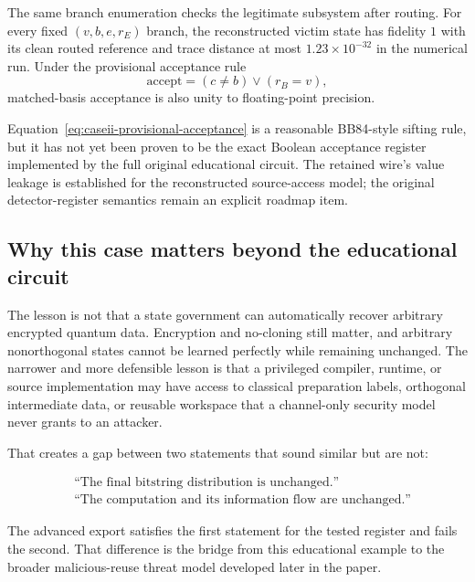 The same branch enumeration checks the legitimate subsystem after routing. For
every fixed $(v,b,e,r_E)$ branch, the reconstructed victim state has fidelity
$1$ with its clean routed reference and trace distance at most
$1.23\times10^{-32}$ in the numerical run. Under the provisional acceptance
rule
\begin{equation}
  \mathrm{accept}=(c\neq b)\lor(r_B=v),
  \label{eq:caseii-provisional-acceptance}
\end{equation}
matched-basis acceptance is also unity to floating-point precision.

\begin{rem}
Equation~\eqref{eq:caseii-provisional-acceptance} is a reasonable BB84-style
sifting rule, but it has not yet been proven to be the exact Boolean acceptance
register implemented by the full original educational circuit. The retained
wire's value leakage is established for the reconstructed source-access model;
the original detector-register semantics remain an explicit roadmap item.
\end{rem}

\subsection{Why this case matters beyond the educational circuit}

The lesson is not that a state government can automatically recover arbitrary
encrypted quantum data. Encryption and no-cloning still matter, and arbitrary
nonorthogonal states cannot be learned perfectly while remaining unchanged.
The narrower and more defensible lesson is that a privileged compiler, runtime,
or source implementation may have access to classical preparation labels,
orthogonal intermediate data, or reusable workspace that a channel-only
security model never grants to an attacker.

That creates a gap between two statements that sound similar but are not:

\begin{align}
  &\text{``The final bitstring distribution is unchanged.''}\label{eq:caseii-same-histogram}\\
  &\text{``The computation and its information flow are unchanged.''}\label{eq:caseii-same-computation}
\end{align}

The advanced export satisfies the first statement for the tested register and
fails the second. That difference is the bridge from this educational example
to the broader malicious-reuse threat model developed later in the paper.
